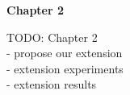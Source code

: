 \begin{center}
	{\Large \bfseries  Chapter 2}
\end{center}

TODO: Chapter 2 \\
- propose our extension \\
- extension experiments \\
- extension results
